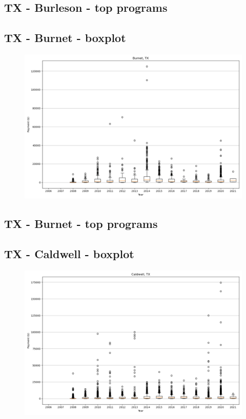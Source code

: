 \subsection*{TX - Burleson - top programs}

\newpage
\subsection*{TX - Burnet - boxplot}
\begin{figure}[h]
\centering
\includegraphics[width=7in]{../output/boxplots/counties/Burnet-TX_boxplot.png}
\end{figure}


\subsection*{TX - Burnet - top programs}

\newpage
\subsection*{TX - Caldwell - boxplot}
\begin{figure}[h]
\centering
\includegraphics[width=7in]{../output/boxplots/counties/Caldwell-TX_boxplot.png}
\end{figure}


